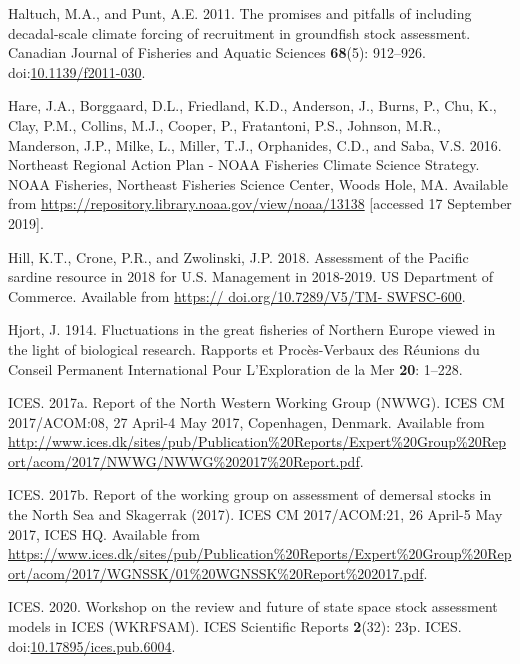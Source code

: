 \documentclass[]{article}
\begin{document}
\leavevmode\hypertarget{ref-haltuch2011Promises}{}%
Haltuch, M.A., and Punt, A.E. 2011. The promises and pitfalls of
including decadal-scale climate forcing of recruitment in groundfish
stock assessment. Canadian Journal of Fisheries and Aquatic Sciences
\textbf{68}(5): 912--926.
doi:\href{https://doi.org/10.1139/f2011-030}{10.1139/f2011-030}.

\leavevmode\hypertarget{ref-hare2016Northeast}{}%
Hare, J.A., Borggaard, D.L., Friedland, K.D., Anderson, J., Burns, P.,
Chu, K., Clay, P.M., Collins, M.J., Cooper, P., Fratantoni, P.S.,
Johnson, M.R., Manderson, J.P., Milke, L., Miller, T.J., Orphanides,
C.D., and Saba, V.S. 2016. Northeast Regional Action Plan - NOAA
Fisheries Climate Science Strategy. NOAA Fisheries, Northeast Fisheries
Science Center, Woods Hole, MA. Available from
\url{https://repository.library.noaa.gov/view/noaa/13138} {[}accessed 17
September 2019{]}.

\leavevmode\hypertarget{ref-hill2018Assessment}{}%
Hill, K.T., Crone, P.R., and Zwolinski, J.P. 2018. Assessment of the
Pacific sardine resource in 2018 for U.S. Management in 2018-2019. US
Department of Commerce. Available from
\href{https://\%20doi.org/10.7289/V5/TM-\%20SWFSC-600}{https:// doi.org/10.7289/V5/TM- SWFSC-600}.

\leavevmode\hypertarget{ref-hjort1914Fluctuations}{}%
Hjort, J. 1914. Fluctuations in the great fisheries of Northern Europe
viewed in the light of biological research. Rapports et Procès-Verbaux
des Réunions du Conseil Permanent International Pour L'Exploration de la
Mer \textbf{20}: 1--228.

\leavevmode\hypertarget{ref-ices2017Reporta}{}%
ICES. 2017a. Report of the North Western Working Group (NWWG). ICES CM
2017/ACOM:08, 27 April-4 May 2017, Copenhagen, Denmark. Available from
\url{http://www.ices.dk/sites/pub/Publication\%20Reports/Expert\%20Group\%20Report/acom/2017/NWWG/NWWG\%202017\%20Report.pdf}.

\leavevmode\hypertarget{ref-ices2017Report}{}%
ICES. 2017b. Report of the working group on assessment of demersal
stocks in the North Sea and Skagerrak (2017). ICES CM 2017/ACOM:21, 26
April-5 May 2017, ICES HQ. Available from
\url{https://www.ices.dk/sites/pub/Publication\%20Reports/Expert\%20Group\%20Report/acom/2017/WGNSSK/01\%20WGNSSK\%20Report\%202017.pdf}.

\leavevmode\hypertarget{ref-ices2020Workshop}{}%
ICES. 2020. Workshop on the review and future of state space stock
assessment models in ICES (WKRFSAM). ICES Scientific Reports
\textbf{2}(32): 23p. ICES.
doi:\href{https://doi.org/10.17895/ices.pub.6004}{10.17895/ices.pub.6004}.
\end{document}
